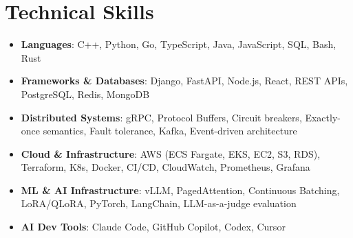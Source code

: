 \documentclass[letterpaper,11pt]{article}
\newcommand{\resumeSubHeadingListStart}{\begin{itemize}[leftmargin=0.15in, label={}]}
\newcommand{\resumeSubHeadingListEnd}{\end{itemize}}
\newcommand{\resumeSkillHeading}[2]{%
  \item\small{\textbf{#1}: #2 \vspace{-9pt}}%
}
\begin{document}
\section{Technical Skills}
  \resumeSubHeadingListStart
    \resumeSkillHeading{Languages}{C++, Python, Go, TypeScript, Java, JavaScript, SQL, Bash, Rust}
    \resumeSkillHeading{Frameworks \& Databases}{Django, FastAPI, Node.js, React, REST APIs, PostgreSQL, Redis, MongoDB}
    \resumeSkillHeading{Distributed Systems}{gRPC, Protocol Buffers, Circuit breakers, Exactly-once semantics, Fault tolerance, Kafka, Event-driven architecture}
    \resumeSkillHeading{Cloud \& Infrastructure}{AWS (ECS Fargate, EKS, EC2, S3, RDS), Terraform, K8s, Docker, CI/CD, CloudWatch, Prometheus, Grafana}
    \resumeSkillHeading{ML \& AI Infrastructure}{vLLM, PagedAttention, Continuous Batching, LoRA/QLoRA, PyTorch, LangChain, LLM-as-a-judge evaluation}
    \resumeSkillHeading{AI Dev Tools}{Claude Code, GitHub Copilot, Codex, Cursor}
  \resumeSubHeadingListEnd
\end{document}
